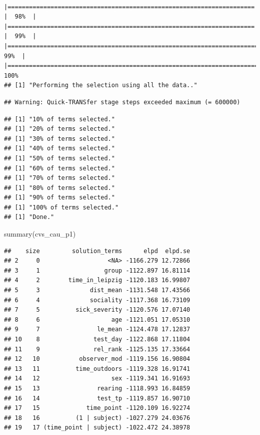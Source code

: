\documentclass[
]{article}
\newenvironment{Shaded}{\begin{snugshade}}{\end{snugshade}}
\newcommand{\FunctionTok}[1]{\textcolor[rgb]{0.00,0.00,0.00}{#1}}
\newcommand{\NormalTok}[1]{#1}
\begin{document}
\begin{verbatim}
         |===================================================================== |  98%  |                                                                              |===================================================================== |  99%  |                                                                              |======================================================================|  99%  |                                                                              |======================================================================| 100%
## [1] "Performing the selection using all the data.."
\end{verbatim}

\begin{verbatim}
## Warning: Quick-TRANSfer stage steps exceeded maximum (= 600000)
\end{verbatim}

\begin{verbatim}
## [1] "10% of terms selected."
## [1] "20% of terms selected."
## [1] "30% of terms selected."
## [1] "40% of terms selected."
## [1] "50% of terms selected."
## [1] "60% of terms selected."
## [1] "70% of terms selected."
## [1] "80% of terms selected."
## [1] "90% of terms selected."
## [1] "100% of terms selected."
## [1] "Done."
\end{verbatim}

\begin{Shaded}
\begin{Highlighting}[]
\FunctionTok{summary}\NormalTok{(cvs\_cau\_p1)}
\end{Highlighting}
\end{Shaded}

\begin{verbatim}
##    size         solution_terms      elpd  elpd.se
## 2     0                   <NA> -1166.279 12.72866
## 3     1                  group -1122.897 16.81114
## 4     2        time_in_leipzig -1120.183 16.99807
## 5     3              dist_mean -1131.548 17.43566
## 6     4              sociality -1117.368 16.73109
## 7     5          sick_severity -1120.576 17.07140
## 8     6                    age -1121.051 17.05310
## 9     7                le_mean -1124.478 17.12837
## 10    8               test_day -1122.868 17.11804
## 11    9               rel_rank -1125.135 17.33664
## 12   10           observer_mod -1119.156 16.90804
## 13   11          time_outdoors -1119.328 16.91741
## 14   12                    sex -1119.341 16.91693
## 15   13                rearing -1118.993 16.84859
## 16   14                test_tp -1119.857 16.90710
## 17   15             time_point -1120.109 16.92274
## 18   16          (1 | subject) -1027.279 24.03676
## 19   17 (time_point | subject) -1022.472 24.38978
\end{verbatim}
\end{document}
